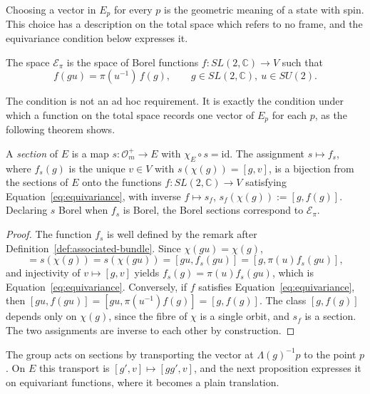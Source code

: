 Choosing a vector in $E_p$ for every $p$ is the geometric meaning of a state with spin. This choice has a description on the total space which refers to no frame, and the equivariance condition below expresses it.

\begin{definition}\label{def:equivariant}
	The space $\mathcal{E}_\pi$ is the space of Borel functions $f:SL(2,\mathbb{C})\to V$ such that
	\begin{equation}\label{eq:equivariance}
		f(gu)=\pi(u^{-1})\,f(g),\qquad g\in SL(2,\mathbb{C}),\ u\in SU(2).
	\end{equation}
\end{definition}

The condition is not an ad hoc requirement. It is exactly the condition under which a function on the total space records one vector of $E_p$ for each $p$, as the following theorem shows.

\begin{theorem}\label{thm:equivariant-sections}
	A \emph{section} of $E$ is a map $s:\mathcal{O}_m^+\to E$ with $\chi_E\circ s=\mathrm{id}$. The assignment $s\mapsto f_s$, where $f_s(g)$ is the unique $v\in V$ with $s(\chi(g))=[g,v]$, is a bijection from the sections of $E$ onto the functions $f:SL(2,\mathbb{C})\to V$ satisfying Equation~\eqref{eq:equivariance}, with inverse $f\mapsto s_f$, $s_f(\chi(g)):=[g,f(g)]$. Declaring $s$ Borel when $f_s$ is Borel, the Borel sections correspond to $\mathcal{E}_\pi$.
\end{theorem}

\begin{proof}
	The function $f_s$ is well defined by the remark after Definition~\ref{def:associated-bundle}. Since $\chi(gu)=\chi(g)$,
	\begin{equation*}
		[g,f_s(g)]=s(\chi(g))=s(\chi(gu))=[gu,f_s(gu)]=[g,\pi(u)f_s(gu)],
	\end{equation*}
	and injectivity of $v\mapsto[g,v]$ yields $f_s(g)=\pi(u)f_s(gu)$, which is Equation~\eqref{eq:equivariance}. Conversely, if $f$ satisfies Equation~\eqref{eq:equivariance}, then $[gu,f(gu)]=[gu,\pi(u^{-1})f(g)]=[g,f(g)]$. The class $[g,f(g)]$ depends only on $\chi(g)$, since the fibre of $\chi$ is a single orbit, and $s_f$ is a section. The two assignments are inverse to each other by construction.
\end{proof}

The group acts on sections by transporting the vector at $\Lambda(g)^{-1}p$ to the point $p$. On $E$ this transport is $[g',v]\mapsto[gg',v]$, and the next proposition expresses it on equivariant functions, where it becomes a plain translation.

